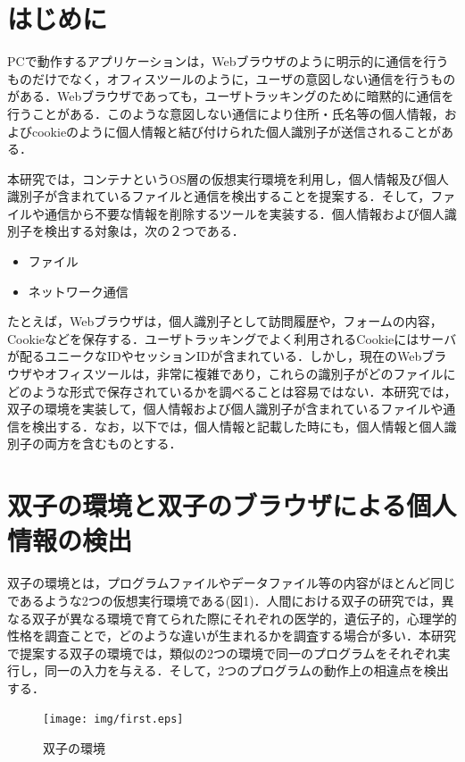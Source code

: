 \documentclass[submit]{ipsj}
\begin{document}
\section{はじめに}
PCで動作するアプリケーションは，Webブラウザのように明示的に通信を行うものだけでなく，オフィスツールのように，ユーザの意図しない通信を行うものがある．Webブラウザであっても，ユーザトラッキングのために暗黙的に通信を行うことがある．このような意図しない通信により住所・氏名等の個人情報，およびcookieのように個人情報と結び付けられた個人識別子が送信されることがある．

本研究では，コンテナというOS層の仮想実行環境を利用し，個人情報及び個人識別子が含まれているファイルと通信を検出することを提案する\cite{web}．そして，ファイルや通信から不要な情報を削除するツールを実装する．個人情報および個人識別子を検出する対象は，次の２つである．
\begin{itemize}
\item
ファイル
\item
ネットワーク通信 
\end{itemize}

たとえば，Webブラウザは，個人識別子として訪問履歴や，フォームの内容，Cookieなどを保存する．ユーザトラッキングでよく利用されるCookieにはサーバが配るユニークなIDやセッションIDが含まれている．しかし，現在のWebブラウザやオフィスツールは，非常に複雑であり，これらの識別子がどのファイルにどのような形式で保存されているかを調べることは容易ではない．本研究では，双子の環境を実装して，個人情報および個人識別子が含まれているファイルや通信を検出する．なお，以下では，個人情報と記載した時にも，個人情報と個人識別子の両方を含むものとする．


\section{双子の環境と双子のブラウザによる個人情報の検出}

双子の環境とは，プログラムファイルやデータファイル等の内容がほとんど同じであるような2つの仮想実行環境である(図1)．人間における双子の研究では，異なる双子が異なる環境で育てられた際にそれぞれの医学的，遺伝子的，心理学的性格を調査ことで，どのような違いが生まれるかを調査する場合が多い．本研究で提案する双子の環境では，類似の2つの環境で同一のプログラムをそれぞれ実行し，同一の入力を与える．そして，2つのプログラムの動作上の相違点を検出する．

\begin{figure}[t]
\begin{center}
\texttt{[image: img/first.eps]}
\caption{双子の環境}
\label{figure:twin}
\end{center}
\end{figure}
\end{document}
